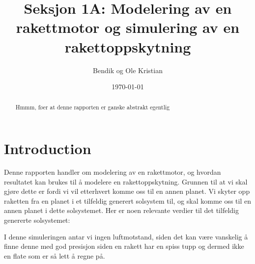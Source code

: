 \documentclass[reprint,english,notitlepage]{revtex4-1}
\begin{document}
\title{Seksjon 1A: Modelering av en rakettmotor og simulering av en rakettoppskytning}
\author{Bendik og Ole Kristian}
\date{\today}
\noaffiliation                %
\begin{abstract}
	Hmmm, føer at denne rapporten er ganske abstrakt egentlig
\end{abstract}
\maketitle                    %

\section{Introduction}
	Denne rapporten handler om modelering av en rakettmotor, og hvordan resultatet
	kan brukes til å modelere en rakettoppskytning. Grunnen til at vi skal gjøre dette
	er fordi vi vil etterhvert komme oss til en annen planet. Vi skyter opp raketten
	fra en planet i et tilfeldig generert solsystem til, og skal komme oss til
	en annen planet i dette solsystemet. Her er noen relevante verdier til det
	tilfeldig genererte solsystemet:

	\begin{table}[h]
		\caption{Solsystemverdier}\label{table}
	\end{table}
	I denne simuleringen antar vi ingen luftmotstand, siden det kan være vanskelig å finne
	denne med god presisjon siden en rakett har en spiss tupp og dermed ikke en flate som er
	så lett å regne på.
\end{document}
